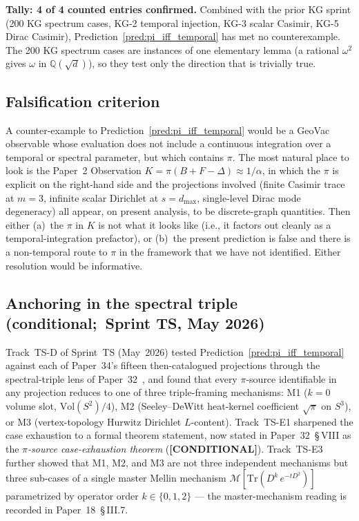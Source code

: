 \documentclass[11pt]{article}
\begin{document}
\textbf{Tally: 4 of 4 counted entries confirmed.}  Combined with the
prior KG sprint (200 KG spectrum cases, KG-2 temporal injection, KG-3
scalar Casimir, KG-5 Dirac Casimir), Prediction~\ref{pred:pi_iff_temporal}
has met no counterexample.  The 200 KG spectrum cases are instances of
one elementary lemma (a rational $\omega^2$ gives $\omega$ in
$\mathbb{Q}(\sqrt{d})$), so they test only the direction that is
trivially true.

\subsection{Falsification criterion}

A counter-example to Prediction~\ref{pred:pi_iff_temporal} would be a
GeoVac observable whose evaluation does not include a continuous
integration over a temporal or spectral parameter, but which contains
$\pi$.  The most natural place to look is the Paper~2 Observation
$K = \pi(B + F - \Delta) \approx 1/\alpha$, in which the $\pi$ is
explicit on the right-hand side and the projections involved (finite
Casimir trace at $m=3$, infinite scalar Dirichlet at $s = d_\text{max}$,
single-level Dirac mode degeneracy) all appear, on present analysis,
to be discrete-graph quantities.  Then either (a)~the
$\pi$ in $K$ is not what it looks like (i.e., it factors out cleanly
as a temporal-integration prefactor), or (b)~the present prediction is
false and there is a non-temporal route to $\pi$ in the framework that
we have not identified.  Either resolution would be informative.

\subsection{Anchoring in the spectral triple (conditional;\ Sprint TS, May 2026)}
\label{sec:tsd_promotion}

Track~TS-D of Sprint~TS (May~2026) tested
Prediction~\ref{pred:pi_iff_temporal} against each of Paper~34's
fifteen then-catalogued projections through the spectral-triple lens of
Paper~32~\cite{paper32}, and found that every $\pi$-source identifiable
in any projection reduces to one of three triple-framing mechanisms:
M1 ($k = 0$ volume slot, $\mathrm{Vol}(S^2)/4$), M2 (Seeley--DeWitt
heat-kernel coefficient $\sqrt{\pi}$ on $S^3$), or M3 (vertex-topology
Hurwitz Dirichlet $L$-content).  Track~TS-E1 sharpened the case
exhaustion to a formal theorem statement, now stated in Paper~32~\S\,VIII
as the \emph{$\pi$-source case-exhaustion theorem} (\textbf{[CONDITIONAL]}).
Track~TS-E3 further showed that M1, M2, and M3 are not three
independent mechanisms but three sub-cases of a single master Mellin
mechanism $\mathcal{M}[\mathrm{Tr}(D^k\,e^{-tD^2})]$ parametrized by
operator order $k \in \{0, 1, 2\}$ — the master-mechanism reading is
recorded in Paper~18~\S\,III.7.
\end{document}
